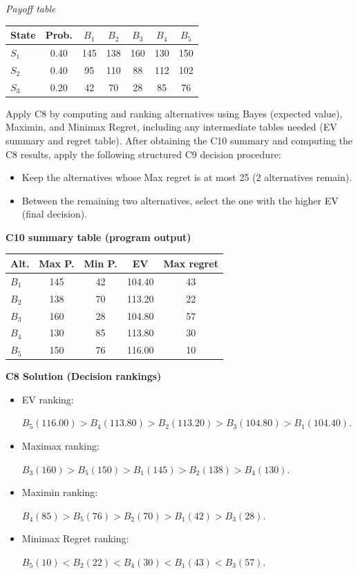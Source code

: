\begin{ExamProblems}
		\begin{center}
			\textit{Payoff table} \\
			\begin{tabular}{l c c c c c c}
				\hline
				State& Prob. & $B_1$ & $B_2$ & $B_3$ & $B_4$ & $B_5$ \\
				\hline
				$S_1$ & 0.40 & 145 & 138 & 160 & 130 & 150 \\
				$S_2$ & 0.40 & 95 & 110 & 88 & 112 & 102 \\
				$S_3$ & 0.20 & 42 & 70 & 28 & 85 & 76 \\
				\hline
			\end{tabular}
		\end{center}
		
		Apply C8 by computing and ranking alternatives using Bayes (expected value), Maximin, and Minimax Regret, including any intermediate tables needed (EV summary and regret table).
		After obtaining the C10 summary and computing the C8 results, apply the following structured C9 decision procedure:
		\begin{itemize}
			\item Keep the alternatives whose Max regret is at most 25 (2 alternatives remain).
			\item Between the remaining two alternatives, select the one with the higher EV (final decision).
		\end{itemize}
		
		\vspace{0.25cm}
		
		\textbf{C10 summary table (program output)}\par
		\begin{center}
			\begin{tabular}{l c c c c}
				\hline
				Alt. & Max P. & Min P. & EV & Max regret \\
				\hline
				$B_1$ & 145 & 42 & 104.40 & 43 \\
				$B_2$ & 138 & 70 & 113.20 & 22 \\
				$B_3$ & 160 & 28 & 104.80 & 57 \\
				$B_4$ & 130 & 85 & 113.80 & 30 \\
				$B_5$ & 150 & 76 & 116.00 & 10 \\
				\hline
			\end{tabular}
		\end{center}
		
		\textbf{C8 Solution (Decision rankings)}\par
		\begin{itemize}
			\item EV ranking: \par $B_5(116.00)>B_4(113.80)>B_2(113.20)>B_3(104.80)>B_1(104.40)$.
			\item Maximax ranking:\par $B_3(160)>B_5(150)>B_1(145)>B_2(138)>B_4(130)$.
			\item Maximin ranking: \par $B_4(85)>B_5(76)>B_2(70)>B_1(42)>B_3(28)$.
			\item Minimax Regret ranking:\par $B_5(10)<B_2(22)<B_4(30)<B_1(43)<B_3(57)$.
		\end{itemize}
		

\end{ExamProblems}
